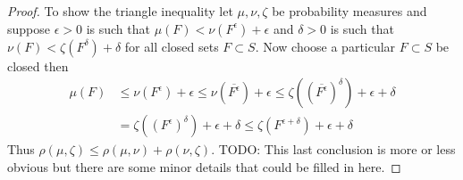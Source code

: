 \begin{proof}
To show the triangle inequality let $\mu, \nu, \zeta$ be probability
measures and suppose $\epsilon > 0$ is such that $\mu(F) <
\nu(F^\epsilon) + \epsilon$ and $\delta > 0$ is such that $\nu(F) <
\zeta(F^\delta) + \delta$ for all closed sets $F \subset S$.  Now
choose a particular $F \subset S$ be closed then
\begin{align*}
\mu(F) 
&\leq \nu(F^\epsilon) + \epsilon 
\leq \nu(\overline{F^\epsilon})+ \epsilon 
\leq \zeta((\overline{F^\epsilon})^\delta)+ \epsilon + \delta \\
&=\zeta((F^\epsilon)^\delta)+ \epsilon + \delta 
\leq \zeta(F^{\epsilon+\delta})+ \epsilon + \delta
\end{align*}
Thus $\rho(\mu, \zeta) \leq \rho(\mu, \nu) + \rho(\nu, \zeta)$.  TODO:
This last conclusion is more or less obvious but there are some minor details that
could be filled in here.
\end{proof}